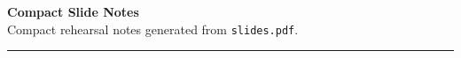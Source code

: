 \documentclass[10pt,a4paper]{article}
\newcommand{\SlidePDF}{slides.pdf}
\newcommand{\DocTitle}{Compact Slide Notes}
\begin{document}
\begin{center}
  {\LARGE\bfseries \DocTitle}\\[0.4em]
  {\small Compact rehearsal notes generated from \texttt{\SlidePDF}.}
\end{center}

\vspace{0.8em}
\hrule
\vspace{1em}

\end{document}
